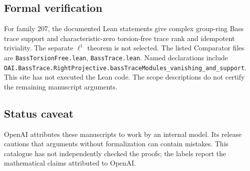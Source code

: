 \documentclass[11pt]{article}
\begin{document}
\subsection{Formal verification}
For family 207, the documented Lean statements give complex group-ring Bass trace support and characteristic-zero torsion-free trace rank and idempotent triviality. The separate $\ell^1$ theorem is not selected. The listed Comparator files are \texttt{BassTorsionFree.lean}, \texttt{BassTrace.lean}. Named declarations include \texttt{OAI.BassTrace.RightProjective.bassTraceModules\_vanishing\_and\_support}. This site has not executed the Lean code. The scope descriptions do not certify the remaining manuscript arguments.

\subsection{Status caveat}
OpenAI attributes these manuscripts to work by an internal model. Its release cautions that arguments without formalization can contain mistakes. This catalogue has not independently checked the proofs; the labels report the mathematical claims attributed to OpenAI.
\end{document}
